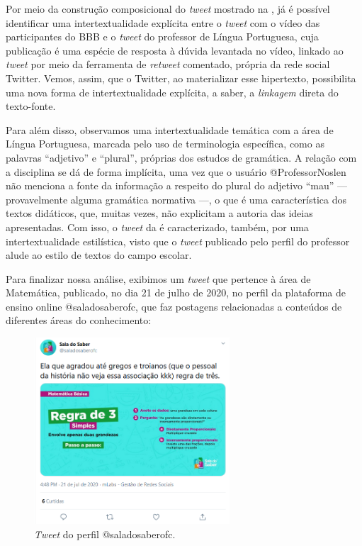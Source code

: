 \documentclass{textolivre}
\begin{document}
Por meio da construção composicional do \textit{tweet} mostrado na , já é possível identificar uma intertextualidade explícita entre o \textit{tweet} com o vídeo das participantes do BBB e o \textit{tweet} do professor de Língua Portuguesa, cuja publicação é uma espécie de resposta à dúvida levantada no vídeo, linkado ao \textit{tweet} por meio da ferramenta de \textit{retweet} comentado, própria da rede social Twitter. Vemos, assim, que o Twitter, ao materializar esse hipertexto, possibilita uma nova forma de intertextualidade explícita, a saber, a \textit{linkagem} direta do texto-fonte.

Para além disso, observamos uma intertextualidade temática com a área de Língua Portuguesa, marcada pelo uso de terminologia específica, como as palavras “adjetivo” e “plural”, próprias dos estudos de gramática. A relação com a disciplina se dá de forma implícita, uma vez que o usuário @ProfessorNoslen não menciona a fonte da informação a respeito do plural do adjetivo “mau” — provavelmente alguma gramática normativa —, o que é uma característica dos textos didáticos, que, muitas vezes, não explicitam a autoria das ideias apresentadas. Com isso, o \textit{tweet} da  é caracterizado, também, por uma intertextualidade estilística, visto que o \textit{tweet} publicado pelo perfil do professor alude ao estilo de textos do campo escolar.

Para finalizar nossa análise, exibimos um \textit{tweet} que pertence à área de Matemática, publicado, no dia 21 de julho de 2020, no perfil da plataforma de ensino online @saladosaberofc, que faz postagens relacionadas a conteúdos de diferentes áreas do conhecimento:

\begin{figure}[htbp]
 \centering
 \includegraphics[width=0.65\textwidth]{Fig7.png}
 \caption{\textit{Tweet} do perfil @saladosaberofc.}
 \label{fig07}
\end{figure}
\end{document}
